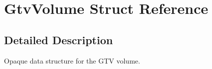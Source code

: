 \section{GtvVolume Struct Reference}
\label{structGtvVolume}


\subsection{Detailed Description}
Opaque data structure for the GTV volume. 

